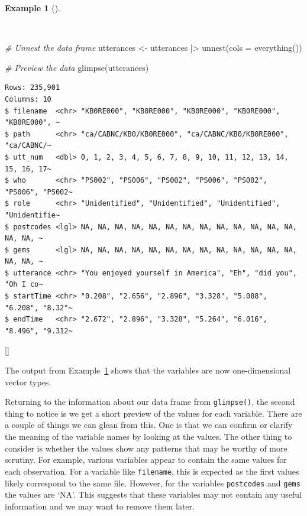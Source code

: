 \documentclass[
  letterpaper,
  krantz1]{latex/krantz-mod}
\newenvironment{Shaded}{\begin{snugshade}}{\end{snugshade}}
\newcommand{\AttributeTok}[1]{\textcolor[rgb]{0.00,0.00,0.00}{#1}}
\newcommand{\CommentTok}[1]{\textcolor[rgb]{0.00,0.00,0.00}{\textit{#1}}}
\newcommand{\FunctionTok}[1]{\textcolor[rgb]{0.00,0.00,0.00}{#1}}
\newcommand{\NormalTok}[1]{\textcolor[rgb]{0.00,0.00,0.00}{#1}}
\newcommand{\OtherTok}[1]{\textcolor[rgb]{0.00,0.00,0.00}{#1}}
\newcommand{\SpecialCharTok}[1]{\textcolor[rgb]{0.00,0.00,0.00}{#1}}
\newcommand{\cindex}[1]{%
  \StrSubstitute{#1}{_}{\_}[\temp]%
  \index{\temp}%
}
\theoremstyle{definition}
\theoremstyle{definition}
\newtheorem{example}{Example}[chapter]
\theoremstyle{remark}
\begin{document}
\begin{example}[]\protect\hypertarget{exm-acquire-unnest}{}\label{exm-acquire-unnest}

~

\begin{Shaded}
\begin{Highlighting}[numbers=left,,]
\CommentTok{\# Unnest the data frame}
\NormalTok{utterances }\OtherTok{\textless{}{-}}
\NormalTok{  utterances }\SpecialCharTok{|\textgreater{}}
  \FunctionTok{unnest}\NormalTok{(}\AttributeTok{cols =} \FunctionTok{everything}\NormalTok{())}

\CommentTok{\# Preview the data}
\FunctionTok{glimpse}\NormalTok{(utterances)}
\end{Highlighting}
\end{Shaded}

\begin{verbatim}
Rows: 235,901
Columns: 10
$ filename  <chr> "KB0RE000", "KB0RE000", "KB0RE000", "KB0RE000", "KB0RE000", ~
$ path      <chr> "ca/CABNC/KB0/KB0RE000", "ca/CABNC/KB0/KB0RE000", "ca/CABNC/~
$ utt_num   <dbl> 0, 1, 2, 3, 4, 5, 6, 7, 8, 9, 10, 11, 12, 13, 14, 15, 16, 17~
$ who       <chr> "PS002", "PS006", "PS002", "PS006", "PS002", "PS006", "PS002~
$ role      <chr> "Unidentified", "Unidentified", "Unidentified", "Unidentifie~
$ postcodes <lgl> NA, NA, NA, NA, NA, NA, NA, NA, NA, NA, NA, NA, NA, NA, NA, ~
$ gems      <lgl> NA, NA, NA, NA, NA, NA, NA, NA, NA, NA, NA, NA, NA, NA, NA, ~
$ utterance <chr> "You enjoyed yourself in America", "Eh", "did you", "Oh I co~
$ startTime <chr> "0.208", "2.656", "2.896", "3.328", "5.088", "6.208", "8.32"~
$ endTime   <chr> "2.672", "2.896", "3.328", "5.264", "6.016", "8.496", "9.312~
\end{verbatim}

\cindex{unnest()}

\end{example}

The output from Example~\ref{exm-acquire-unnest} shows that the
variables are now one-dimensional vector types.

Returning to the information about our data frame from
\texttt{glimpse()}, the second thing to notice is we get a short preview
of the values for each variable. There are a couple of things we can
glean from this. One is that we can confirm or clarify the meaning of
the variable names by looking at the values. The other thing to consider
is whether the values show any patterns that may be worthy of more
scrutiny. For example, various variables appear to contain the same
values for each observation. For a variable like \texttt{filename}, this
is expected as the first values likely correspond to the same file.
However, for the variables \texttt{postcodes} and \texttt{gems} the
values are `NA'. This suggests that these variables may not contain any
useful information and we may want to remove them later.
\end{document}

